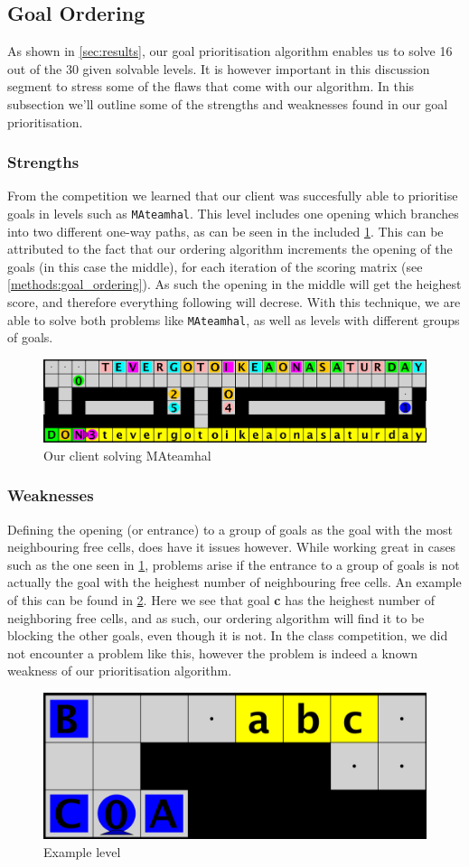 \subsection{Goal Ordering}
\label{subsec:disc_goal_ordering}

As shown in \cref{sec:results}, our goal prioritisation algorithm enables us to solve 16 out of the 30 given solvable levels. 
It is however important in this discussion segment to stress some of the flaws that come with our algorithm. 
In this subsection we'll outline some of the strengths and weaknesses found in our goal prioritisation. 

\subsubsection{Strengths} From the competition we learned that our client was succesfully able to prioritise goals in levels such as \texttt{MAteamhal}. 
This level includes one opening which branches into two different one-way paths, as can be seen in the included \cref{fig:mateamhal}.
This can be attributed to the fact that our ordering algorithm increments the opening of the goals (in this case the middle), for each iteration of the scoring matrix (see \cref{methods:goal_ordering}). 
As such the opening in the middle will get the heighest score, and therefore everything following will decrese. 
With this technique, we are able to solve both problems like \texttt{MAteamhal}, as well as levels with different groups of goals. 

\begin{figure}[h!]
  \centering
  \includegraphics[width=.7\columnwidth]{graphics/mateahhal.png}
  \caption{\label{fig:mateamhal}Our client solving MAteamhal}
\end{figure}

\subsubsection{Weaknesses} Defining the opening (or entrance) to a group of goals as the goal with the most neighbouring free cells, does have it issues however. 
While working great in cases such as the one seen in \cref{fig:mateamhal}, problems arise if the entrance to a group of goals is not actually the goal with the heighest number of neighbouring free cells. 
An example of this can be found in \cref{fig:examplelev}.
Here we see that goal \textbf{c} has the heighest number of neighboring free cells, and as such, our ordering algorithm will find it to be blocking the other goals, even though it is not. 
In the class competition, we did not encounter a problem like this, however the problem is indeed a known weakness of our prioritisation algorithm.

\begin{figure}[h!]
  \centering
  \includegraphics[width=.6\columnwidth]{graphics/ordering_issue.png}
  \caption{\label{fig:examplelev}Example level}
\end{figure}
 